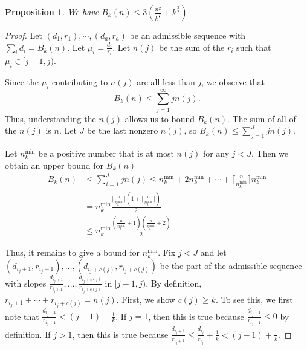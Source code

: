 \documentclass[11pt,reqno]{amsart}
\theoremstyle{plain}
\newtheorem{proposition}[theorem]{Proposition}
\theoremstyle{definition}
\theoremstyle{remark}
\numberwithin{equation}{section}
\numberwithin{equation}{section}
\begin{document}
\begin{proposition}
\label{Phibound}
We have $B_k(n) \leq 3 \left(\frac{n^2}{k^{\frac{3}{2}}}+k^{\frac{3}{2}} \right)$
\end{proposition}
\begin{proof}
Let $(d_1,r_1), \cdots, (d_a,r_a)$ be an admissible sequence with $\sum_i d_i = B_k(n)$. Let $\mu_i = \frac{d_i}{r_i}$. Let $n(j)$ be the sum of the $r_i$ such that $\mu_i\in [j-1,j)$.

Since the $\mu_i$ contributing to $n(j)$ are all less than $j$, we observe that
\[ B_k(n) \leq \sum_{j=1}^\infty jn(j)  .\]
Thus, understanding the $n(j)$ allows us to bound $B_k(n)$. The sum of all of the $n(j)$ is $n$. Let $J$ be the last nonzero $n(j)$, so $B_k(n) \leq \sum_{j=1}^{J} j n(j)$.

Let $n_k^{\min}$ be a positive number that is at most $n(j)$ for any $j < J$. Then we obtain an upper bound for $B_k(n)$
\begin{align*}
     B_k(n)& \leq \sum_{i=1}^J jn(j)\leq n_k^{\min}+2n_k^{\min}+\cdots+\lceil \frac{n}{n_k^{\min}}\rceil n_k^{\min}\\
     &= n_k^{\min} \frac{\lceil \frac{n}{n_k^{\min}}\rceil(1+\lceil\frac{n}{n_k^{\min}}\rceil)}{2}\\
     &\leq n_k^{\min} \frac{(\frac{n}{n_k^{\min}}+1)(\frac{n}{n_k^{\min}}+2)}{2}
\end{align*}

Thus, it remains to give a bound for $n_k^{\min}$. Fix $j<J$ and let $(d_{i_j+1},r_{i_j+1}),\ldots,(d_{i_j+c(j)},r_{i_j+c(j)})$ be the part of the admissible sequence with slopes $\frac{d_{i_j+1}}{r_{i_j+1}},\ldots,\frac{d_{i_j+c(j)}}{r_{i_j+c(j)}}$ in $[j-1,j)$. By definition, $r_{i_j+1}+\cdots+r_{i_j+c(j)}=n(j)$. First, we show $c(j)\geq k$. To see this, we first note that $\frac{d_{i_j+1}}{r_{i_j+1}}< (j-1)+\frac{1}{k}$. If $j=1$, then this is true because $\frac{d_{i_j+1}}{r_{i_j+1}}\leq 0$ by definition. If $j>1$, then this is true because $\frac{d_{i_j+1}}{r_{i_j+1}}\leq \frac{d_{i_j}}{r_{i_j}}+\frac{1}{k}<(j-1)+\frac{1}{k}$.


\end{proof}
\end{document}
